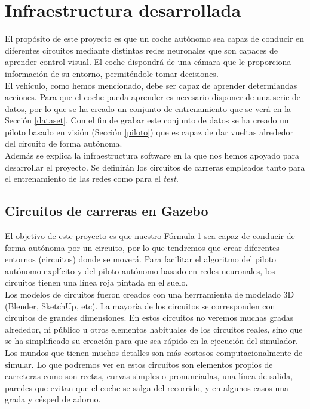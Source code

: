 \chapter{Infraestructura desarrollada}\label{cap.infraestructura}

El propósito de este proyecto es que un coche autónomo sea capaz de conducir en diferentes circuitos mediante distintas redes neuronales que son capaces de aprender control visual. El coche dispondrá de una cámara que le proporciona información de su entorno, permiténdole tomar decisiones.\\

El vehículo, como hemos mencionado, debe ser capaz de aprender determiandas acciones. Para que el coche pueda aprender es necesario disponer de una serie de datos, por lo que se ha creado un conjunto de entrenamiento que se verá en la Sección \ref{dataset}. Con el fin de grabar este conjunto de datos se ha creado un piloto basado en visión (Sección \ref{piloto}) que es capaz de dar vueltas alrededor del circuito de forma autónoma.\\

Además se explica la infraestructura software en la que nos hemos apoyado  para desarrollar el proyecto. Se definirán los circuitos de carreras empleados tanto para el entrenamiento de las redes como para el \textit{test}. 

\section{Circuitos de carreras en Gazebo}\label{modelos_circuitos}

El objetivo de este proyecto es que nuestro Fórmula 1 sea capaz de conducir de forma autónoma por un circuito, por lo que tendremos que crear diferentes entornos (circuitos) donde se moverá. Para facilitar el algoritmo del piloto autónomo explícito y del piloto autónomo basado en redes neuronales, los circuitos tienen una línea roja pintada en el suelo.\\

Los modelos de circuitos fueron creados con una herrramienta de modelado 3D (Blender, SketchUp, etc). La mayoría de los circuitos se corresponden con circuitos de grandes dimensiones. En estos circuitos no veremos muchas gradas alrededor, ni público u otros elementos habituales de los circuitos reales, sino que se ha simplificado su creación para que sea rápido en la ejecución del simulador. Los mundos que tienen muchos detalles son más costosos computacionalmente de simular. Lo que podremos ver en estos circuitos son elementos propios de carreteras como son rectas, curvas simples o pronunciadas, una línea de salida, paredes que evitan que el coche se salga del recorrido, y en algunos casos una grada y césped de adorno.\\

